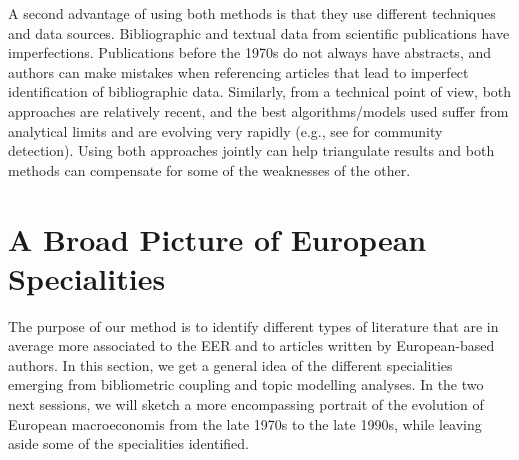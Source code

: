 \documentclass[]{elsarticle} %
\begin{document}
A second advantage of using both methods is that they use different
techniques and data sources. Bibliographic and textual data from
scientific publications have imperfections. Publications before the
1970s do not always have abstracts, and authors can make mistakes when
referencing articles that lead to imperfect identification of
bibliographic data. Similarly, from a technical point of view, both
approaches are relatively recent, and the best algorithms/models used
suffer from analytical limits and are evolving very rapidly (e.g., see
\citet{zhang2020} for community detection). Using both approaches
jointly can help triangulate results and both methods can compensate for
some of the weaknesses of the other.

\hypertarget{a-broad-picture-of-european-specialities}{%
\section{A Broad Picture of European
Specialities}\label{a-broad-picture-of-european-specialities}}

The purpose of our method is to identify different types of literature
that are in average more associated to the EER and to articles written
by European-based authors. In this section, we get a general idea of the
different specialities emerging from bibliometric coupling and topic
modelling analyses. In the two next sessions, we will sketch a more
encompassing portrait of the evolution of European macroeconomis from
the late 1970s to the late 1990s, while leaving aside some of the
specialities identified.
\end{document}
